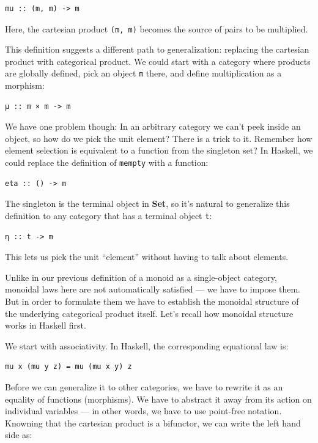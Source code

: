\begin{verbatim}
mu :: (m, m) -> m
\end{verbatim}

Here, the cartesian product \texttt{(m,\ m)} becomes the source of pairs
to be multiplied.

This definition suggests a different path to generalization: replacing
the cartesian product with categorical product. We could start with a
category where products are globally defined, pick an object \texttt{m}
there, and define multiplication as a morphism:

\begin{verbatim}
μ :: m × m -> m
\end{verbatim}

We have one problem though: In an arbitrary category we can't peek
inside an object, so how do we pick the unit element? There is a trick
to it. Remember how element selection is equivalent to a function from
the singleton set? In Haskell, we could replace the definition of
\texttt{mempty} with a function:

\begin{verbatim}
eta :: () -> m
\end{verbatim}

The singleton is the terminal object in \textbf{Set}, so it's natural to
generalize this definition to any category that has a terminal object
\texttt{t}:

\begin{verbatim}
η :: t -> m
\end{verbatim}

This lets us pick the unit ``element'' without having to talk about
elements.

Unlike in our previous definition of a monoid as a single-object
category, monoidal laws here are not automatically satisfied --- we have
to impose them. But in order to formulate them we have to establish the
monoidal structure of the underlying categorical product itself. Let's
recall how monoidal structure works in Haskell first.

We start with associativity. In Haskell, the corresponding equational
law is:

\begin{verbatim}
mu x (mu y z) = mu (mu x y) z
\end{verbatim}

Before we can generalize it to other categories, we have to rewrite it
as an equality of functions (morphisms). We have to abstract it away
from its action on individual variables --- in other words, we have to
use point-free notation. Knowning that the cartesian product is a
bifunctor, we can write the left hand side as:

